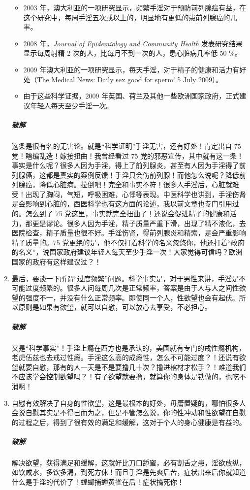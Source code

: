 \begin{enumerate}
\begin{itemize}
        \item 2003 年，澳大利亚的一项研究显示，频繁手淫对于预防前列腺癌有益，在这个研究中，每周手淫五次或以上的，明显地有更低的患前列腺癌的几率。
        \item 2008 年，\textit{Journal of Epidemiology and Community Health} 发表研究结果显示每周射精 2 次的人，比每月不到一次的人，患心脏病几率低 50 \%。
        \item 2009 年澳大利亚的一项研究显示，每天手淫，对于精子的健康和活力有好处（The Medical News: Daily sex good for sperm! 5 July 2009）。
        \item 由于这些科学证据，2009 年英国、荷兰及其他一些欧洲国家政府，正式建议年轻人每天至少手淫一次。
    \end{itemize}
    \subparagraph{破解} 这条是很有名的无害论。就是“科学证明”手淫无害，还有好处！肯定出自 75 党！瞎编乱造！嫁接扭曲！我曾经看过 75 党的邪恶宣传，其中就有这一条！事实是什么呢？很多人因为手淫，得上了前列腺炎，甚至有人因为手淫得了前列腺癌，这都是真实的案例反馈！手淫只会伤前列腺！而他怎么说呢？降低前列腺癌，降低心脏病。拉倒吧！完全和事实不符！很多人手淫后，心脏就难受！出现了胸闷，气短，呼吸困难，心悸等表现。中医科学也讲到，手淫伤肾是会影响到心脏的，西医科学也有这方面的论述，我以前文章也专门引用过的。怎么到了 75 党这里，事实就完全扭曲了！还说会促进精子的健康和活力，那更是谬论。很多人因为手淫，精子质量严重下滑，出现了精不液化，去医院检查，精子质量也很不好。手淫伤肾，得前列腺炎和精索，是会严重影响精子质量的。75 党更绝的是，他不仅打着科学的名义忽悠你，他还打着“政府的名义”，说国家政府建议年轻人每天至少手淫一次！大家觉得可信吗？欧洲国家的政府有这样建议过？！
    \item 最后，要谈一下所谓“过度频繁”问题。科学事实是，对于男性来讲，手淫是不可能过度频繁的。很多人问每周几次是正常频率，答案是由于人与人之间性欲望的强度不一，并没有什么正常频率。即使同一个人，性欲望也会有起伏。所以原则是如果有欲望，就可以自慰，可以放心去享受，不必担心。
    \subparagraph{破解} 又是“科学事实”！手淫上瘾在西方也是承认的，美国就有专门的戒性瘾机构，老虎伍兹也去戒过性瘾。手淫这么高的成瘾性，怎么不可能过度？！还说有欲望就要自慰，那有的人一天是不是要撸几十次？撸进棺材才松手？！难道我们不应该学会控制欲望吗？！有了欲望就要撸，就算你的身体是铁做的，也吃不消啊！
    \item 自慰有效解决了自身的性欲望，这是最根本的好处，毋庸置疑的，哪怕很多人会说自慰其实是不得已而为之，但是不管怎么说，你的性冲动和性欲望在自慰的过程之后，得到了很有效的满足和缓解，这对于个人的身心健康是有益的。
    \subparagraph{破解} 解决欲望，获得满足和缓解，这就好比刀口舔蜜，必有割舌之患，淫欲放纵，如饮咸水，多饮多渴，到死方休！而且手淫是先爽后苦，症状出来后你就知道什么是手淫的代价了！螳螂捕蝉黄雀在后！症状搞死你！

\end{enumerate}
